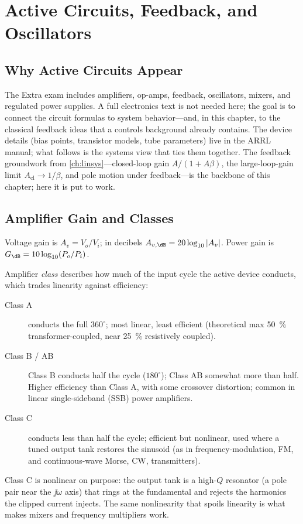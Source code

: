 \chapter{Active Circuits, Feedback, and Oscillators}
\label{ch:active}
\section{Why Active Circuits Appear}
The Extra exam includes amplifiers, op-amps, feedback, oscillators, mixers, and
regulated power supplies. A full electronics text is not needed here; the goal is
to connect the circuit formulas to system behavior---and, in this chapter, to the
classical feedback ideas that a controls background already contains. The device
details (bias points, transistor models, tube parameters) live in the ARRL
manual; what follows is the systems view that ties them together. The feedback
groundwork from \cref{ch:linsys}---closed-loop gain \(A/(1+A\beta)\), the
large-loop-gain limit \(A_{\text{cl}}\to1/\beta\), and pole motion under
feedback---is the backbone of this chapter; here it is put to work.

\section{Amplifier Gain and Classes}
Voltage gain is \(A_v=V_o/V_i\); in decibels \(A_{v,\dB}=20\log_{10}|A_v|\). Power
gain is \(G_{\dB}=10\log_{10}(P_o/P_i)\).

Amplifier \emph{class} describes how much of the input cycle the active device
conducts, which trades linearity against efficiency:
\begin{description}
\item[Class A] conducts the full \(360^\circ\); most linear, least efficient
(theoretical max \SI{50}{\percent} transformer-coupled, near \SI{25}{\percent}
resistively coupled).
\item[Class B / AB] Class B conducts half the cycle (\(180^\circ\)); Class AB
somewhat more than half. Higher efficiency than Class A, with some crossover
distortion; common in linear single-sideband (SSB) power amplifiers.
\item[Class C] conducts less than half the cycle; efficient but nonlinear, used
where a tuned output tank restores the sinusoid (as in frequency-modulation, FM,
and continuous-wave Morse, CW, transmitters).
\end{description}
Class C is nonlinear on purpose: the output tank is a high-\(Q\) resonator (a
pole pair near the \(\jj\omega\) axis) that rings at the fundamental and rejects
the harmonics the clipped current injects. The same nonlinearity that spoils
linearity is what makes mixers and frequency multipliers work.

